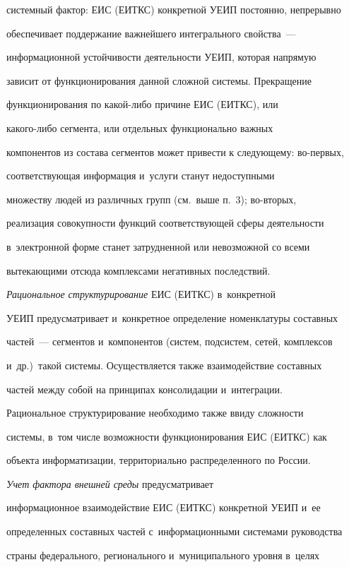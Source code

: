 системный фактор: ЕИС (ЕИТКС) конкретной УЕИП постоянно, непрерывно 

обеспечивает поддержание важнейшего интегрального свойства~--- 

информационной устойчивости деятельности УЕИП, которая напрямую 

зависит от функционирования данной сложной системы. Прекращение 

функционирования по ка\-кой-ли\-бо причине ЕИС (ЕИТКС), или 

 ка\-ко\-го-ли\-бо сегмента, или отдельных функционально важных 

компонентов из состава сегментов может привести к следующему: во-пер\-вых, 

соответствующая информация и~услуги станут недоступными 

множеству людей из различных групп (см.\ выше п.~3); во-вто\-рых, 

реализация со\-во\-куп\-ности функций соответствующей сферы деятельности 

в~электронной форме станет затрудненной или невозможной со всеми 

вытекающими отсюда комплексами негативных последствий.

     

     \textit{Рациональное структурирование} ЕИС (ЕИТКС) в~конкретной 

УЕИП пред\-усмат\-ри\-вает и~конкретное определение номенклатуры составных 

частей~--- сегментов и~компонентов (систем, подсистем, сетей, комплексов 

и~др.)\ такой системы. Осуществляется также взаимодействие составных 

частей между собой на принципах консолидации и~интеграции. 

Рациональное структурирование необходимо также ввиду сложности 

системы, в~том числе возможности функционирования ЕИС (ЕИТКС) как 

объекта информатизации, территориально распределенного по России.

     

     \textit{Учет фактора внешней среды} предусматривает 

информационное взаимодействие ЕИС (ЕИТКС) конкретной УЕИП и~ее 

определенных составных частей с~информационными системами руководства 

страны федерального, регионального и~муниципального уровня в~целях 

